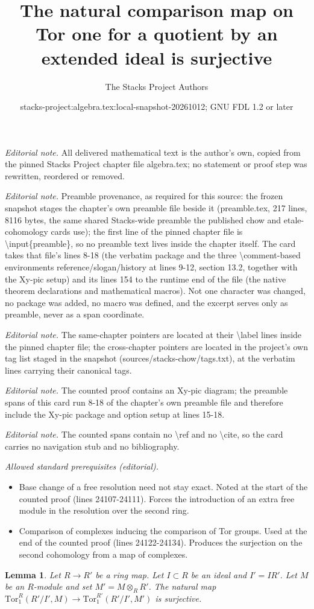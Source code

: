 \documentclass[10pt,a4paper]{amsart}
\title{The natural comparison map on Tor one for a quotient by an extended ideal is surjective}
\author{The Stacks Project Authors}
\date{stacks-project:algebra.tex:local-snapshot-20261012; GNU FDL 1.2 or later}
\theoremstyle{plain}
\newtheorem{lemma}[subsection]{Lemma}
\theoremstyle{definition}
\theoremstyle{remark}
\numberwithin{equation}{subsection}
\begin{document}
\maketitle
\noindent\textit{Editorial note.} All delivered mathematical text is the author's own, copied from the pinned Stacks Project chapter file algebra.tex; no statement or proof step was rewritten, reordered or removed.\par\medskip
\noindent\textit{Editorial note.} Preamble provenance, as required for this source: the frozen snapshot stages the chapter's own preamble file beside it (preamble.tex, 217 lines, 8116 bytes, the same shared Stacks-wide preamble the published chow and etale-cohomology cards use); the first line of the pinned chapter file is \textbackslash{}input\{preamble\}, so no preamble text lives inside the chapter itself. The card takes that file's lines 8-18 (the verbatim package and the three \textbackslash{}comment-based environments reference/slogan/history at lines 9-12, section 13.2, together with the Xy-pic setup) and its lines 154 to the runtime end of the file (the native theorem declarations and mathematical macros). Not one character was changed, no package was added, no macro was defined, and the excerpt serves only as preamble, never as a span coordinate.\par\medskip
\noindent\textit{Editorial note.} The same-chapter pointers are located at their \textbackslash{}label lines inside the pinned chapter file; the cross-chapter pointers are located in the project's own tag list staged in the snapshot (sources/stacks-chow/tags.txt), at the verbatim lines carrying their canonical tags.\par\medskip
\noindent\textit{Editorial note.} The counted proof contains an Xy-pic diagram; the preamble spans of this card run 8-18 of the chapter's own preamble file and therefore include the Xy-pic package and option setup at lines 15-18.\par\medskip
\noindent\textit{Editorial note.} The counted spans contain no \textbackslash{}ref and no \textbackslash{}cite, so the card carries no navigation stub and no bibliography.\par\medskip
\noindent\textit{Allowed standard prerequisites (editorial).}\begin{itemize}
\item Base change of a free resolution need not stay exact. Noted at the start of the counted proof (lines 24107-24111). Forces the introduction of an extra free module in the resolution over the second ring.
\item Comparison of complexes inducing the comparison of Tor groups. Used at the end of the counted proof (lines 24122-24134). Produces the surjection on the second cohomology from a map of complexes.
\end{itemize}\medskip
\begin{lemma}
\label{lemma-surjective-on-tor-one-trivial}
Let $R \to R'$ be a ring map. Let $I \subset R$ be
an ideal and $I' = IR'$. Let $M$ be an $R$-module
and set $M' = M \otimes_R R'$. The natural map
$\text{Tor}_1^R(R'/I', M) \to \text{Tor}_1^{R'}(R'/I', M')$
is surjective.
\end{lemma}
\end{document}
